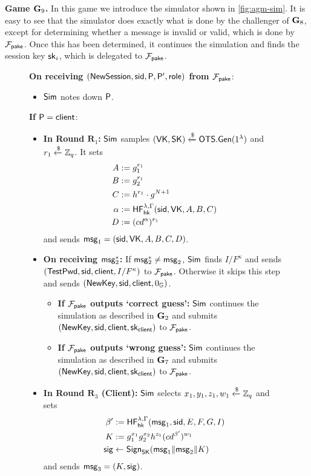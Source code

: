 \textbf{Game $\mathbf{G}_9$.} In this game we introduce the simulator shown in \cref{fig:agm-sim}. It is easy to see that the simulator does exactly what is done by the challenger of $\mathbf{G}_8$, except for determining whether a message is invalid or valid, which is done by $\mathcal{F}_{\mathsf{pake}}$. Once this has been determined, it continues the simulation and finds the session key $\mathsf{sk}_i$, which is delegated to $\mathcal{F}_{\mathsf{pake}}$.

\begin{figure}[tbp]
	\begin{framed}\footnotesize
		\textbf{On receiving $(\mathsf{NewSession}, \mathsf{sid}, \mathsf{P}, \mathsf{P}',\mathsf{role})$ from $\mathcal{F}_{\mathsf{pake}}$}:
		\begin{itemize}
			\item $\mathsf{Sim}$ notes down $\mathsf{P}$.
		\end{itemize}
	
		\textbf{If $\mathsf{P}=\mathsf{client}$}:
		
		\begin{itemize}
			\item \textbf{In Round $\mathbf{R}_1$:} $\mathsf{Sim}$ samples $(\mathsf{VK},\mathsf{SK})\xleftarrow{\$}\mathsf{OTS}.\mathsf{Gen}(1^\lambda)$ and $r_1\xleftarrow{\$}\mathbb{Z}_q$. It sets
			\begin{align*}
				A &:= g_1^{r_1} \\B &:= g_2^{r_1}\\ C &:= h^{r_1}\cdot g^{N+1} \\ \alpha &:= \mathsf{HF}_{\mathsf{hk}}^{\lambda,\Gamma}(\mathsf{sid},\mathsf{VK},A,B,C) \\ D &:= (cd^{\alpha})^{r_1}
			\end{align*}
			and sends $\mathsf{msg}_{1} = (\mathsf{sid},\mathsf{VK},A,B,C,D)$.
			
			\item \textbf{On receiving $\mathsf{msg}_{2}^{*}$:} If $\mathsf{msg}_{2}^{*}\neq\mathsf{msg}_{2}$, $\mathsf{Sim}$ finds $I/F^\kappa$ and sends $(\mathsf{TestPwd},\mathsf{sid},\mathsf{client},I/F^\kappa)$ to $\mathcal{F}_{\mathsf{pake}}$. Otherwise it skips this step and sends $(\mathsf{NewKey},\mathsf{sid}, \mathsf{client},0_{\mathbb{G}})$.
			\begin{itemize}
				\item \textbf{If $\mathcal{F}_{\mathsf{pake}}$ outputs `correct guess':} $\mathsf{Sim}$ continues the simulation as described in $\mathbf{G}_2$ and submits $(\mathsf{NewKey},\mathsf{sid}, \mathsf{client},\mathsf{sk}_{\mathsf{client}})$ to $\mathcal{F}_{\mathsf{pake}}$.
				\item \textbf{If $\mathcal{F}_{\mathsf{pake}}$ outputs `wrong guess':} $\mathsf{Sim}$ continues the simulation as described in $\mathbf{G}_7$ and submits $(\mathsf{NewKey},\mathsf{sid}, \mathsf{client},\mathsf{sk}_{\mathsf{client}})$ to $\mathcal{F}_{\mathsf{pake}}$.
			\end{itemize}
			\item\textbf{In Round $\mathbf{R}_3$ (Client):} $\mathsf{Sim}$ selects $x_1,y_1,z_1,w_1\xleftarrow{\$}\mathbb{Z}_q$ and sets
			\begin{align*}
				\beta' &:= \mathsf{HF}_{\mathsf{hk}}^{\lambda,\Gamma}(\mathsf{msg}_{1},\mathsf{sid},E,F,G,I)\\
				K &:= g_1^{x_1}g_2^{x_2}h^{z_1}(cd^{\beta'})^{w_1}\\
				\mathsf{sig} &\gets\mathsf{Sign}_{\mathsf{SK}}(\mathsf{msg}_{1}\|\mathsf{msg}_{2}\|K)
			\end{align*}
			and sends $\mathsf{msg}_{3} = (K,\mathsf{sig})$.
		\end{itemize}
	

\end{framed}
\end{figure}
